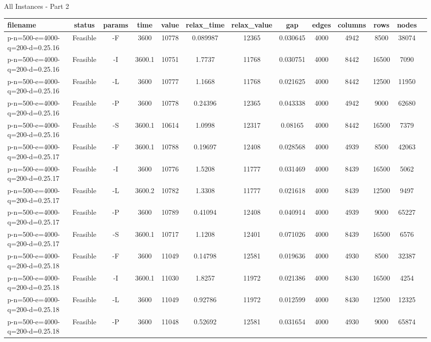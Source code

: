 \documentclass[landscape, a4paper]{article}
\begin{document}
\begin{center}
All Instances - Part 2

\begin{tabular}{lcccccccccccc}
filename & status & params & time & value & relax\_time & relax\_value & gap & edges & columns & rows & nodes & \\
\hline
p-n=500-e=4000-q=200-d=0.25.16 & Feasible & -F & 3600 & 10778 & 0.089987 & 12365 & 0.030645 & 4000 & 4942 & 8500 & 38074 & \\
p-n=500-e=4000-q=200-d=0.25.16 & Feasible & -I & 3600.1 & 10751 & 1.7737 & 11768 & 0.030751 & 4000 & 8442 & 16500 & 7090 & \\
p-n=500-e=4000-q=200-d=0.25.16 & Feasible & -L & 3600 & 10777 & 1.1668 & 11768 & 0.021625 & 4000 & 8442 & 12500 & 11950 & \\
p-n=500-e=4000-q=200-d=0.25.16 & Feasible & -P & 3600 & 10778 & 0.24396 & 12365 & 0.043338 & 4000 & 4942 & 9000 & 62680 & \\
p-n=500-e=4000-q=200-d=0.25.16 & Feasible & -S & 3600.1 & 10614 & 1.0998 & 12317 & 0.08165 & 4000 & 8442 & 16500 & 7379 & \\
p-n=500-e=4000-q=200-d=0.25.17 & Feasible & -F & 3600.1 & 10788 & 0.19697 & 12408 & 0.028568 & 4000 & 4939 & 8500 & 42063 & \\
p-n=500-e=4000-q=200-d=0.25.17 & Feasible & -I & 3600 & 10776 & 1.5208 & 11777 & 0.031469 & 4000 & 8439 & 16500 & 5062 & \\
p-n=500-e=4000-q=200-d=0.25.17 & Feasible & -L & 3600.2 & 10782 & 1.3308 & 11777 & 0.021618 & 4000 & 8439 & 12500 & 9497 & \\
p-n=500-e=4000-q=200-d=0.25.17 & Feasible & -P & 3600 & 10789 & 0.41094 & 12408 & 0.040914 & 4000 & 4939 & 9000 & 65227 & \\
p-n=500-e=4000-q=200-d=0.25.17 & Feasible & -S & 3600.1 & 10717 & 1.1208 & 12401 & 0.071026 & 4000 & 8439 & 16500 & 6576 & \\
p-n=500-e=4000-q=200-d=0.25.18 & Feasible & -F & 3600 & 11049 & 0.14798 & 12581 & 0.019636 & 4000 & 4930 & 8500 & 32387 & \\
p-n=500-e=4000-q=200-d=0.25.18 & Feasible & -I & 3600.1 & 11030 & 1.8257 & 11972 & 0.021386 & 4000 & 8430 & 16500 & 4254 & \\
p-n=500-e=4000-q=200-d=0.25.18 & Feasible & -L & 3600 & 11049 & 0.92786 & 11972 & 0.012599 & 4000 & 8430 & 12500 & 12325 & \\
p-n=500-e=4000-q=200-d=0.25.18 & Feasible & -P & 3600 & 11048 & 0.52692 & 12581 & 0.031654 & 4000 & 4930 & 9000 & 65874 & \\

\end{tabular}
\end{center}
\end{document}
